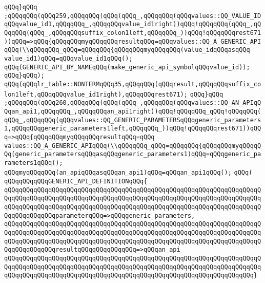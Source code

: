 \verb|qQQq}qQQq|\newline
\verb|;qQQqqQQq(qQQq259,qQQqqQQq(qQQq(qQQq_,qQQqqQQq(qQQqvalues::QQ_VALUE_IDqQQqvalue_id1,qQQqqQQq_,qQQqqQQqvalue_id1right))qQQq!qQQqqQQq(qQQq_,qQQqqQQq(qQQq_,qQQqqQQqsuffix_colon1left,qQQqqQQq_))qQQq!qQQqqQQqrest671))qQQq=>qQQq{qQQqqQQqmyqQQqqQQqresultqQQq=qQQqvalues::QQ_A_GENERIC_APIqQQq(\\qQQqqQQq_qQQq=qQQqqQQq{qQQqqQQqmyqQQqqQQq(value_idqQQqasqQQq|\newline
\verb|value_id1)qQQq=qQQqvalue_id1qQQq();|\newline
\verb|qQQq(GENERIC_API_BY_NAMEqQQq(make_generic_api_symbolqQQqvalue_id));|\newline
\verb|qQQq}qQQq);|\newline
\verb|qQQq(qQQqlr_table::NONTERMqQQq35,qQQqqQQq(qQQqresult,qQQqqQQqsuffix_colon1left,qQQqqQQqvalue_id1right),qQQqqQQqrest671);|\newline
\verb|qQQq}qQQq|\newline
\verb|;qQQqqQQq(qQQq260,qQQqqQQq(qQQq(qQQq_,qQQqqQQq(qQQqvalues::QQ_AN_APIqQQqan_api1,qQQqqQQq_,qQQqqQQqan_api1right))qQQq!qQQqqQQq_qQQq!qQQqqQQq(qQQq_,qQQqqQQq(qQQqvalues::QQ_GENERIC_PARAMETERSqQQqgeneric_parameters1,qQQqqQQqgeneric_parameters1left,qQQqqQQq_))qQQq!qQQqqQQqrest671))qQQq=>qQQq{qQQqqQQqmyqQQqqQQqresultqQQq=qQQq|\newline
\verb|values::QQ_A_GENERIC_APIqQQq(\\qQQqqQQq_qQQq=qQQqqQQq{qQQqqQQqmyqQQqqQQq(generic_parametersqQQqasqQQqgeneric_parameters1)qQQq=qQQqgeneric_parameters1qQQq();|\newline
\verb|qQQqmyqQQqqQQq(an_apiqQQqasqQQqan_api1)qQQq=qQQqan_api1qQQq();|\newline
\verb|qQQq(|\newline
\verb|qQQqqQQqqQQqGENERIC_API_DEFINITIONqQQq{|\newline
\verb|qQQqqQQqqQQqqQQqqQQqqQQqqQQqqQQqqQQqqQQqqQQqqQQqqQQqqQQqqQQqqQQqqQQqqQQqqQQqqQQqqQQqqQQqqQQqqQQqqQQqqQQqqQQqqQQqqQQqqQQqqQQqqQQqqQQqqQQqqQQqqQQqqQQqqQQqqQQqqQQqqQQqqQQqqQQqqQQqqQQqqQQqqQQqqQQqqQQqqQQqqQQqqQQqqQQqqQQqqQQqqQQqparameterqQQq=>qQQqgeneric_parameters,|\newline
\verb|qQQqqQQqqQQqqQQqqQQqqQQqqQQqqQQqqQQqqQQqqQQqqQQqqQQqqQQqqQQqqQQqqQQqqQQqqQQqqQQqqQQqqQQqqQQqqQQqqQQqqQQqqQQqqQQqqQQqqQQqqQQqqQQqqQQqqQQqqQQqqQQqqQQqqQQqqQQqqQQqqQQqqQQqqQQqqQQqqQQqqQQqqQQqqQQqqQQqqQQqqQQqqQQqqQQqqQQqqQQqqQQqresultqQQqqQQqqQQqqQQq=>qQQqan_api|\newline
\verb|qQQqqQQqqQQqqQQqqQQqqQQqqQQqqQQqqQQqqQQqqQQqqQQqqQQqqQQqqQQqqQQqqQQqqQQqqQQqqQQqqQQqqQQqqQQqqQQqqQQqqQQqqQQqqQQqqQQqqQQqqQQqqQQqqQQqqQQqqQQqqQQqqQQqqQQqqQQqqQQqqQQqqQQqqQQqqQQqqQQqqQQqqQQqqQQqqQQqqQQqqQQqqQQq}|\newline
